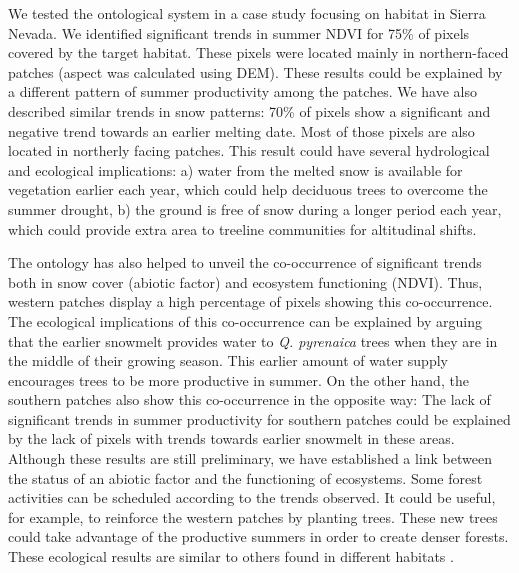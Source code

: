 We tested the ontological system in a case study focusing on \Qp habitat in Sierra Nevada. We identified significant trends in summer NDVI for 75\% of pixels covered by the target habitat. These pixels were located mainly in northern-faced patches (aspect was calculated using DEM). These results could be explained by a different pattern of summer productivity among the \Qp patches. We have also described similar trends in snow patterns: 70\% of pixels show a significant and negative trend towards an earlier melting date. Most of those pixels are also located in northerly facing patches. This result could have several hydrological and ecological implications: a) water from the melted snow is available for vegetation earlier each year, which could help deciduous trees to overcome the summer drought, b) the ground is free of snow during a longer period each year, which could provide extra area to treeline communities for altitudinal shifts.

The ontology has also helped to unveil the co-occurrence of significant trends both in snow cover (abiotic factor) and ecosystem functioning (NDVI). Thus, western patches display a high percentage of pixels showing this co-occurrence. The ecological implications of this co-occurrence can be explained by arguing that the earlier snowmelt provides water to \emph{Q. pyrenaica }trees when they are in the middle of their growing season. This earlier amount of water supply encourages trees to be more productive in summer. On the other hand, the southern patches also show this co-occurrence in the opposite way: The lack of significant trends in summer productivity for southern patches could be explained by the lack of pixels with trends towards earlier snowmelt in these areas. Although these results are still preliminary, we have established a link between the status of an abiotic factor and the functioning of ecosystems. Some forest activities can be scheduled according to the trends observed. It could be useful, for example, to reinforce the western patches by planting \Qp trees. These new trees could take advantage of the productive summers in order to create denser forests. These ecological results are similar to others found in different habitats \textcite{Trujilloetal2012ElevationdependentInfluence}.

